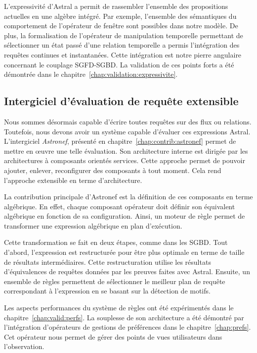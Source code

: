 L'expressivité d'Astral a permit de rassembler l'ensemble des propositions actuelles en une algèbre intégré. Par exemple, l'ensemble des sémantiques du comportement de l'opérateur de fenêtre sont possibles dans notre modèle. De plus, la formalisation de l'opérateur de manipulation temporelle permettant de sélectionner un état passé d'une relation temporelle a permis l'intégration des requêtes continues et instantanées. Cette intégration est notre pierre angulaire concernant le couplage SGFD-SGBD. La validation de ces points forts a été démontrée dans le chapitre~\ref{chap:validation:expressivite}.

\subsection{Intergiciel d'évaluation de requête extensible}
Nous sommes désormais capable d'écrire toutes requêtes sur des flux ou relations. Toutefois, nous devons avoir un système capable d'évaluer ces expressions Astral. L'intergiciel \textit{Astronef}, présenté en chapitre~\ref{chap:contrib:astronef} permet de mettre en œuvre une telle évaluation. Son architecture interne est dirigée par les architectures à composants orientés services. Cette approche permet de pouvoir ajouter, enlever, reconfigurer des composants à tout moment. Cela rend l'approche extensible en terme d'architecture.

La contribution principale d'Astronef est la définition de ces composants en terme algébrique. En effet, chaque composant opérateur doit définir son équivalent algébrique en fonction de sa configuration. Ainsi, un moteur de règle permet de transformer une expression algébrique en plan d'exécution.

Cette transformation se fait en deux étapes, comme dans les SGBD. Tout d'abord, l'expression est restructurée pour être plus optimale en terme de taille de résultats intermédiaires. Cette restructuration utilise les résultats d'équivalences de requêtes données par les preuves faites avec Astral. Ensuite, un ensemble de règles permettent de sélectionner le meilleur plan de requête correspondant à l'expression en se basant sur la détection de motifs.

Les aspects performances du système de règles ont été expérimentés dans le chapitre~\ref{chap:valid:perfs}. La souplesse de son architecture a été démontré par l'intégration d'opérateurs de gestions de préférences dans le chapitre~\ref{chap:prefs}. Cet opérateur nous permet de gérer des points de vues utilisateurs dans l'observation.


